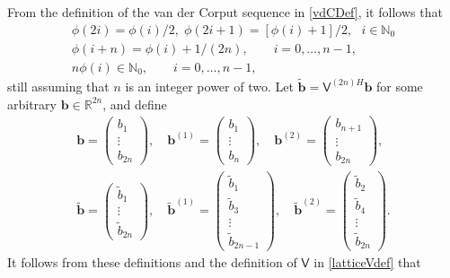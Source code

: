 \documentclass[twocolumn]{svjour3}          %
\newcommand{\bm}[1]{\boldsymbol{#1}}
\newcommand{\natzero}{\mathbb{N}_0}
\newcommand{\reals}{\mathbb{R}}
\newcommand{\vb}{\bm{b}}
\newcommand{\mV}{\mathsf{V}}
\begin{document}
From the definition of the van der Corput sequence in \eqref{vdCDef}, it follows that
\begin{gather} 
\label{vdCProp}
\phi(2i) = \phi(i)/2, \;  \phi(2i+1) = [\phi(i)+1]/2, \ \ \ i \in \natzero\\
\label{vdCPropB}
\phi(i+n) = \phi(i) + 1/(2n), \qquad i = 0, \ldots, n-1,
\\
\label{vdCPropC}
n \phi(i) \in \natzero, \qquad i = 0, \ldots, n-1,
\end{gather}
still assuming that $n$ is an integer power of two.
Let $\widetilde{\vb} = \mV^{(2n)H}\vb$ for some arbitrary $\vb \in \reals^{2n}$, and define
\begin{gather*}
\vb = \begin{pmatrix} b_1 \\ \vdots \\ b_{2n} \end{pmatrix}, \quad 
\vb^{(1)} = \begin{pmatrix} b_1 \\ \vdots \\ b_{n} \end{pmatrix}, \quad 
\vb^{(2)}  = \begin{pmatrix} b_{n+1} \\ \vdots \\ b_{2n} \end{pmatrix}, \\ 
\widetilde{\vb} = \begin{pmatrix} \widetilde{b}_1 \\ \vdots \\ \widetilde{b}_{2n} \end{pmatrix}, \quad 
\widetilde{\vb}^{(1)} = \begin{pmatrix} \widetilde{b}_1 \\ \widetilde{b}_3 \\ \vdots \\ \widetilde{b}_{2n-1} \end{pmatrix}, \quad 
\widetilde{\vb}^{(2)}  = \begin{pmatrix} \widetilde{b}_{2} \\  \widetilde{b}_{4} \\ \vdots \\ \widetilde{b}_{2n} \end{pmatrix}. 
\end{gather*}
It follows from these definitions and the definition of $\mV$ in  \eqref{latticeVdef} that
\end{document}
